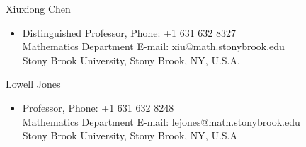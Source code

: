 \documentclass[10pt]{article}
\newenvironment{innerlist}[1][\enskip\textbullet]%
        {\begin{itemize}[#1,leftmargin=*,parsep=0pt,itemsep=0pt,topsep=0pt,partopsep=0pt]}
        {\end{itemize}}
\newcommand{\halfblankline}{\quad\vspace{-0.5\baselineskip}\pagebreak[3]}
\begin{document}
\halfblankline

Xiuxiong Chen
\begin{innerlist}
\item[] Distinguished Professor, \hfill {Phone: +1 631 632 8327}\\
Mathematics Department \hfill{E-mail: xiu@math.stonybrook.edu}\\
Stony Brook University, Stony Brook, NY, U.S.A.
\end{innerlist}
\halfblankline


Lowell Jones
\begin{innerlist}
\item[] Professor, \hfill {Phone: +1 631 632 8248}\\
Mathematics Department \hfill{E-mail: lejones@math.stonybrook.edu}\\
Stony Brook University, Stony Brook, NY, U.S.A
\end{innerlist}
\end{document}
